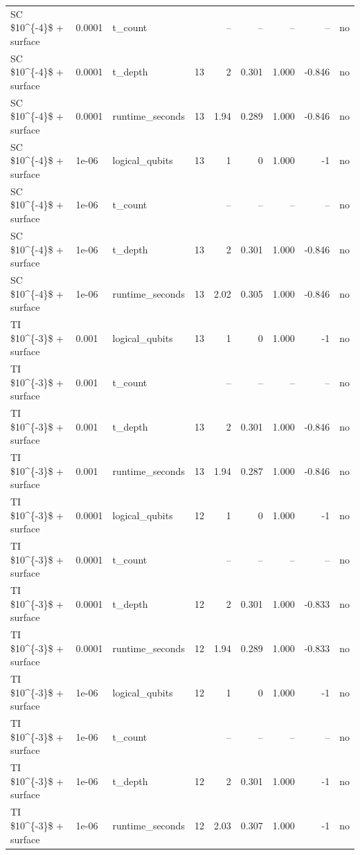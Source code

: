 \begin{tabular}{lllrrrrrl}
SC \$10\textasciicircum{}\{-4\}\$ + surface & 0.0001 & t\_count &  & -- & -- & -- & -- & no \\
SC \$10\textasciicircum{}\{-4\}\$ + surface & 0.0001 & t\_depth & 13 & 2 & 0.301 & 1.000 & -0.846 & no \\
SC \$10\textasciicircum{}\{-4\}\$ + surface & 0.0001 & runtime\_seconds & 13 & 1.94 & 0.289 & 1.000 & -0.846 & no \\
SC \$10\textasciicircum{}\{-4\}\$ + surface & 1e-06 & logical\_qubits & 13 & 1 & 0 & 1.000 & -1 & no \\
SC \$10\textasciicircum{}\{-4\}\$ + surface & 1e-06 & t\_count &  & -- & -- & -- & -- & no \\
SC \$10\textasciicircum{}\{-4\}\$ + surface & 1e-06 & t\_depth & 13 & 2 & 0.301 & 1.000 & -0.846 & no \\
SC \$10\textasciicircum{}\{-4\}\$ + surface & 1e-06 & runtime\_seconds & 13 & 2.02 & 0.305 & 1.000 & -0.846 & no \\
TI \$10\textasciicircum{}\{-3\}\$ + surface & 0.001 & logical\_qubits & 13 & 1 & 0 & 1.000 & -1 & no \\
TI \$10\textasciicircum{}\{-3\}\$ + surface & 0.001 & t\_count &  & -- & -- & -- & -- & no \\
TI \$10\textasciicircum{}\{-3\}\$ + surface & 0.001 & t\_depth & 13 & 2 & 0.301 & 1.000 & -0.846 & no \\
TI \$10\textasciicircum{}\{-3\}\$ + surface & 0.001 & runtime\_seconds & 13 & 1.94 & 0.287 & 1.000 & -0.846 & no \\
TI \$10\textasciicircum{}\{-3\}\$ + surface & 0.0001 & logical\_qubits & 12 & 1 & 0 & 1.000 & -1 & no \\
TI \$10\textasciicircum{}\{-3\}\$ + surface & 0.0001 & t\_count &  & -- & -- & -- & -- & no \\
TI \$10\textasciicircum{}\{-3\}\$ + surface & 0.0001 & t\_depth & 12 & 2 & 0.301 & 1.000 & -0.833 & no \\
TI \$10\textasciicircum{}\{-3\}\$ + surface & 0.0001 & runtime\_seconds & 12 & 1.94 & 0.289 & 1.000 & -0.833 & no \\
TI \$10\textasciicircum{}\{-3\}\$ + surface & 1e-06 & logical\_qubits & 12 & 1 & 0 & 1.000 & -1 & no \\
TI \$10\textasciicircum{}\{-3\}\$ + surface & 1e-06 & t\_count &  & -- & -- & -- & -- & no \\
TI \$10\textasciicircum{}\{-3\}\$ + surface & 1e-06 & t\_depth & 12 & 2 & 0.301 & 1.000 & -1 & no \\
TI \$10\textasciicircum{}\{-3\}\$ + surface & 1e-06 & runtime\_seconds & 12 & 2.03 & 0.307 & 1.000 & -1 & no \\

\end{tabular}
